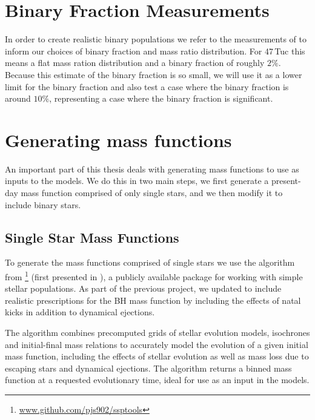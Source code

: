 \section{Binary Fraction Measurements}

In order to create realistic binary populations we refer to the measurements of \citet{Milone2012} to
inform our choices of binary fraction and mass ratio distribution. For 47\,Tuc this means a flat
mass ration distribution and a binary fraction of roughly $2\%$. Because this estimate of the binary
fraction is so small, we will use it as a lower limit for the binary fraction and also test a case
where the binary fraction is around $10\%$, representing a case where the binary fraction is
significant.




\section{Generating mass functions}

An important part of this thesis deals with generating mass functions to use as inputs to the
 models. We do this in two main steps, we first generate a present-day mass function
comprised of only single stars, and we then modify it to include binary stars.

\subsection{Single Star Mass Functions}


To generate the mass functions comprised of single stars we use the \evolvemf{} algorithm from
\footnote{\url{www.github.com/pjs902/ssptools}} (first presented in
\citealt{Balbinot2018}), a publicly available package for working with simple stellar populations.
As part of the previous project, we updated \evolvemf{} to include realistic prescriptions for the BH
mass function by including the effects of natal kicks in addition to dynamical ejections.

The \evolvemf{} algorithm combines precomputed grids of stellar evolution models, isochrones and
initial-final mass relations to accurately model the evolution of a given initial mass function,
including the effects of stellar evolution as well as mass loss due to escaping stars and dynamical
ejections. The algorithm returns a binned mass function at a requested evolutionary time, ideal for
use as an input in the  models.

